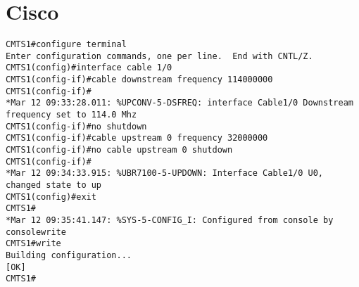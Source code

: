 \section{Cisco}

\begin{lstlisting}[language=CISCO] 
CMTS1#configure terminal 
Enter configuration commands, one per line.  End with CNTL/Z. 
CMTS1(config)#interface cable 1/0 
CMTS1(config-if)#cable downstream frequency 114000000 
CMTS1(config-if)# 
*Mar 12 09:33:28.011: %UPCONV-5-DSFREQ: interface Cable1/0 Downstream frequency set to 114.0 Mhz 
CMTS1(config-if)#no shutdown 
CMTS1(config-if)#cable upstream 0 frequency 32000000 
CMTS1(config-if)#no cable upstream 0 shutdown 
CMTS1(config-if)# 
*Mar 12 09:34:33.915: %UBR7100-5-UPDOWN: Interface Cable1/0 U0, changed state to up 
CMTS1(config)#exit 
CMTS1# 
*Mar 12 09:35:41.147: %SYS-5-CONFIG_I: Configured from console by consolewrite 
CMTS1#write 
Building configuration... 
[OK] 
CMTS1# 
\end{lstlisting} 